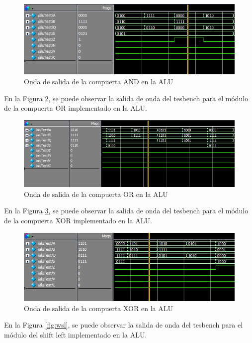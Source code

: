 \documentclass[journal]{IEEEtran}
\begin{document}
	\begin{figure}[hbtp]
		\centering
		\includegraphics[scale = 0.5]{img/wand.png}
		\caption{Onda de salida de la compuerta AND en la ALU}
		\label{fig:wand}
	\end{figure}
	
	En la Figura \ref{fig:wor}, se puede observar la salida de onda del tesbench para el módulo de la compuerta OR implementado en la ALU.
	
	\begin{figure}[hbtp]
		\centering
		\includegraphics[scale = 0.4]{img/wor.png}
		\caption{Onda de salida de la compuerta OR en la ALU}
		\label{fig:wor}
	\end{figure}
	
	En la Figura \ref{fig:wxor}, se puede observar la salida de onda del tesbench para el módulo de la compuerta XOR implementado en la ALU.
	
	\begin{figure}[hbtp]
		\centering
		\includegraphics[scale = 0.5]{img/wxor.png}
		\caption{Onda de salida de la compuerta XOR en la ALU}
		\label{fig:wxor}
	\end{figure}
	
	En la Figura \ref{fig:wsl}, se puede observar la salida de onda del tesbench para el módulo del shift left implementado en la ALU.
	
\end{document}
